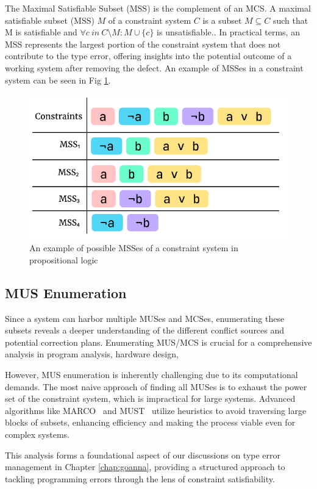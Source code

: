 The Maximal Satisfiable Subset (MSS) is the complement of an MCS. A maximal satisfiable subset (MSS) $M$ of a constraint system $C$ is a subset $M \subseteq C$ such that M is satisfiable and $\forall{c}\ in\ C \setminus M:M\cup\{c\}$ is unsatisfiable.. In practical terms, an MSS represents the largest portion of the constraint system that does not contribute to the type error, offering insights into the potential outcome of a working system after removing the defect. An example of MSSes in a constraint system can be seen in Fig \ref{fig:mss-example}.




\begin{figure}[hbt]
  \includegraphics[width=0.8\linewidth]{MSS}
  \caption{
    \label{fig:mss-example}
      An example of possible MSSes of a constraint system in propositional logic}
\end{figure}

\subsection{MUS Enumeration}

Since a system can harbor multiple MUSes and MCSes, enumerating these subsets reveals a deeper understanding of the different conflict sources and potential correction plans. Enumerating MUS/MCS is crucial for a comprehensive analysis in program analysis, hardware design, 

However, MUS enumeration is inherently challenging due to its computational demands. The most naive approach of finding all MUSes is to exhaust the power set of the constraint system, which is impractical for large systems. Advanced algorithms like MARCO~\cite{Liffiton2016-xi} and MUST~\cite{Bendik2020-pz} utilize heuristics to avoid traversing large blocks of subsets, enhancing efficiency and making the process viable even for complex systems.

This analysis forms a foundational aspect of our discussions on type error management in Chapter \ref{chap:goanna}, providing a structured approach to tackling programming errors through the lens of constraint satisfiability.


